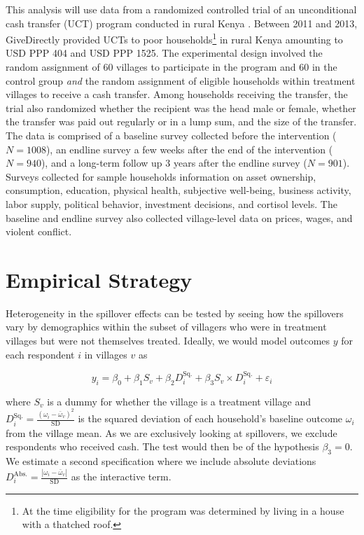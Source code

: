 \documentclass[11pt]{article}
\begin{document}
    This analysis will use data from a randomized controlled trial of an unconditional cash transfer (UCT) program conducted in rural Kenya \parencite{haushofer_short-term_2016}. Between 2011 and 2013, GiveDirectly provided UCTs to poor households\footnote{At the time eligibility for the program was determined by living in a house with a thatched roof.} in rural Kenya amounting to USD PPP 404 and USD PPP 1525. The experimental design involved the random assignment of 60 villages to participate in the program and 60 in the control group \textit{and} the random assignment of eligible households within treatment villages to receive a cash transfer. Among households receiving the transfer, the trial also randomized whether the recipient was the head male or female, whether the transfer was paid out regularly or in a lump sum, and the size of the transfer. The data is comprised of a baseline survey collected before the intervention ($N=1008$), an endline survey a few weeks after the end of the intervention ($N=940$), and a long-term follow up 3 years after the endline survey ($N=901$). Surveys collected for sample households information on asset ownership, consumption, education, physical health, subjective well-being, business activity, labor supply, political behavior, investment decisions, and cortisol levels. The baseline and endline survey also collected village-level data on prices, wages, and violent conflict.

\section{Empirical Strategy}

    Heterogeneity in the spillover effects can be tested by seeing how the spillovers vary by demographics within the subset of villagers who were in treatment villages but were not themselves treated. Ideally, we would model outcomes $y$ for each respondent $i$ in villages $v$ as

    \begin{equation*}
    y_i = \beta_0 + \beta_1 S_v + \beta_2 D^\text{Sq.}_i + \beta_3 S_v \times  D^\text{Sq.}_i + \varepsilon_i
    \end{equation*}

    where $S_v$ is a dummy for whether the village is a treatment village and $D^\text{Sq.}_i = \frac{(\omega_i - \bar{\omega}_v)^2}{\text{SD}}$ is the squared deviation of each household's baseline outcome $\omega_i$ from the village mean. As we are exclusively looking at spillovers, we exclude respondents who received cash. The test would then be of the hypothesis $\beta_3 = 0$. We estimate a second specification where we include absolute deviations $D^\text{Abs.}_i = \frac{|\omega_i - \bar{\omega}_v|}{\text{SD}}$ as the interactive term.
\end{document}
